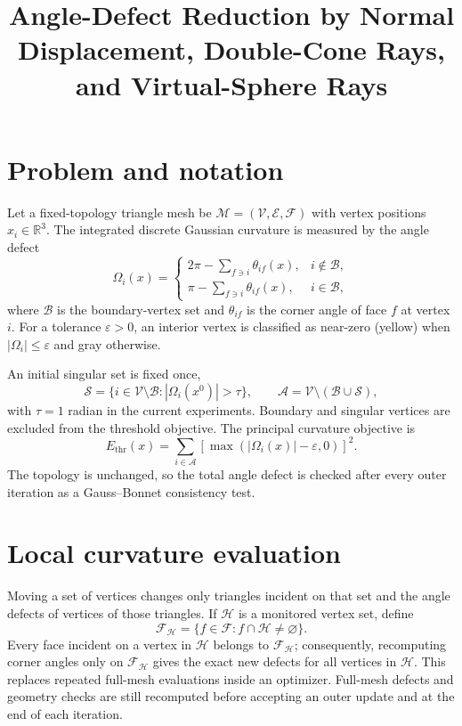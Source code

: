 \documentclass[10pt]{article}
\title{Angle-Defect Reduction by Normal Displacement, Double-Cone Rays,
and Virtual-Sphere Rays}
\author{}
\date{}
\newcommand{\R}{\mathbb{R}}
\newcommand{\V}{\mathcal{V}}
\newcommand{\E}{\mathcal{E}}
\newcommand{\F}{\mathcal{F}}
\newcommand{\B}{\mathcal{B}}
\newcommand{\Sset}{\mathcal{S}}
\newcommand{\A}{\mathcal{A}}
\newcommand{\eps}{\varepsilon}
\begin{document}
\maketitle
\vspace{-2em}

\section{Problem and notation}

Let a fixed-topology triangle mesh be
$\mathcal{M}=(\V,\E,\F)$ with vertex positions
$x_i\in\R^3$.  The integrated discrete Gaussian curvature is measured by
the angle defect
\begin{equation}
\Omega_i(x)=
\begin{cases}
2\pi-\displaystyle\sum_{f\ni i}\theta_{if}(x), & i\notin\B,\\[2mm]
\pi-\displaystyle\sum_{f\ni i}\theta_{if}(x), & i\in\B,
\end{cases}
\label{eq:defect}
\end{equation}
where $\B$ is the boundary-vertex set and $\theta_{if}$ is the corner angle
of face $f$ at vertex $i$.  For a tolerance $\eps>0$, an interior vertex is
classified as near-zero (yellow) when $|\Omega_i|\leq\eps$ and gray otherwise.

An initial singular set is fixed once,
\begin{equation}
\Sset=\{i\in\V\setminus\B:|\Omega_i(x^0)|>\tau\},
\qquad
\A=\V\setminus(\B\cup\Sset),
\end{equation}
with $\tau=1$ radian in the current experiments.  Boundary and singular
vertices are excluded from the threshold objective.  The principal curvature
objective is
\begin{equation}
E_{\mathrm{thr}}(x)=
\sum_{i\in\A}\left[\max(|\Omega_i(x)|-\eps,0)\right]^2.
\label{eq:threshold-energy}
\end{equation}
The topology is unchanged, so the total angle defect is checked after every
outer iteration as a Gauss--Bonnet consistency test.

\section{Local curvature evaluation}

Moving a set of vertices changes only triangles incident on that set and the
angle defects of vertices of those triangles.  If $\mathcal{H}$ is a monitored
vertex set, define
\begin{equation}
\F_{\mathcal H}=\{f\in\F:f\cap\mathcal H\neq\varnothing\}.
\end{equation}
Every face incident on a vertex in $\mathcal H$ belongs to
$\F_{\mathcal H}$; consequently, recomputing corner angles only on
$\F_{\mathcal H}$ gives the exact new defects for all vertices in
$\mathcal H$.  This replaces repeated full-mesh evaluations inside an
optimizer.  Full-mesh defects and geometry checks are still recomputed before
accepting an outer update and at the end of each iteration.
\end{document}
